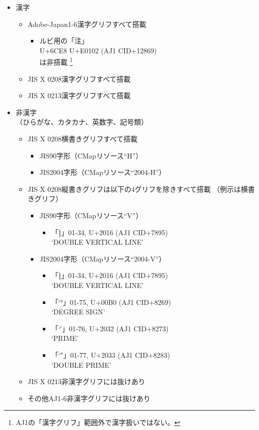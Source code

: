 \begin{itemize}
\item 漢字
  \begin{itemize}
  \item Adobe-Japan1-6漢字グリフすべて搭載
    \begin{itemize}
    \item ルビ用の「注」 \\
      U+6CE8 U+E0102 (AJ1 CID+12869) \\
      は非搭載
      \footnote{AJ1の「漢字グリフ」範囲外で漢字扱いではない。}
    \end{itemize}
  \item JIS X 0208漢字グリフすべて搭載
  \item JIS X 0213漢字グリフすべて搭載
  \end{itemize}
\item 非漢字 \\
    （ひらがな、カタカナ、英数字、記号類）
  \begin{itemize}
  \item JIS X 0208横書きグリフすべて搭載
    \begin{itemize}
    \item JIS90字形（CMapリソース``H''）
    \item JIS2004字形（CMapリソース``2004-H''）
    \end{itemize}
  \item JIS X 0208縦書きグリフは以下の4グリフを除きすべて搭載
    （例示は横書きグリフ）
    \begin{itemize}
    \item JIS90字形（CMapリソース``V''）
      \begin{itemize}
      \item 「‖」01-34, U+2016 (AJ1 CID+7895) \\
        `DOUBLE VERTICAL LINE'
      \end{itemize}
    \item JIS2004字形（CMapリソース``2004-V''）
      \begin{itemize}
      \item 「‖」01-34, U+2016 (AJ1 CID+7895) \\
        `DOUBLE VERTICAL LINE'
      \item 「\ltjjachar`°」01-75, U+00B0 (AJ1 CID+8269) \\
        `DEGREE SIGN'
      \item 「\ltjjachar`′」01-76, U+2032 (AJ1 CID+8273) \\
        `PRIME'
      \item 「\ltjjachar`″」01-77, U+2033 (AJ1 CID+8283) \\
        `DOUBLE PRIME'
      \end{itemize}
    \end{itemize}
  \item JIS X 0213非漢字グリフには抜けあり
  \item その他AJ1-6非漢字グリフには抜けあり
  \end{itemize}
\end{itemize}

